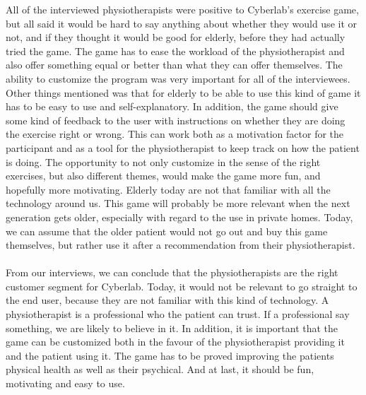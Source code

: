 All of the interviewed physiotherapists were positive to Cyberlab’s exercise game, but all said it would be hard to say anything about whether they would use it or not, and if they thought it would be good for elderly, before they had actually tried the game. The game has to ease the workload of the physiotherapist and also offer something equal or better than what they can offer themselves. The ability to customize the program was very important for all of the interviewees. Other things mentioned was that for elderly to be able to use this kind of game it has to be easy to use and self-explanatory. In addition, the game should give some kind of feedback to the user with instructions on whether they are doing the exercise right or wrong. This can work both as a motivation factor for the participant and as a tool for the physiotherapist to keep track on how the patient is doing. The opportunity to not only customize in the sense of the right exercises, but also different themes, would make the game more fun, and hopefully more motivating. Elderly today are not that familiar with all the technology around us. This game will probably be more relevant when the next generation gets older, especially with regard to the use in private homes. Today, we can assume that the older patient would not go out and buy this game themselves, but rather use it after a recommendation from their physiotherapist.\\ \\
From our interviews, we can conclude that the physiotherapists are the right customer segment for Cyberlab. Today, it would not be relevant to go straight to the end user, because they are not familiar with this kind of technology. A physiotherapist is a professional who the patient can trust. If a professional say something, we are likely to believe in it. In addition, it is important that the game can be customized both in the favour of the physiotherapist providing it and the patient using it. The game has to be proved improving the patients physical health as well as their psychical. And at last, it should be fun, motivating and easy to use. 



